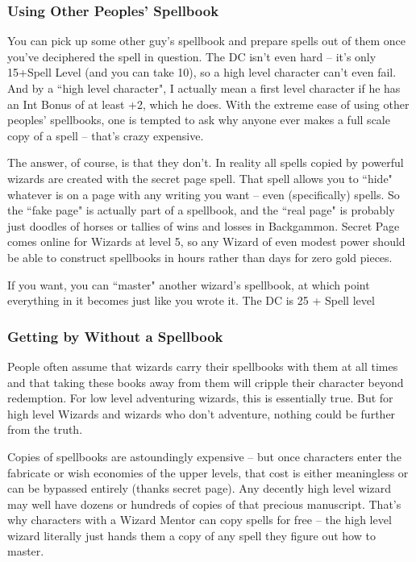 \subsubsection{Using Other Peoples' Spellbook}

You can pick up some other guy's spellbook and prepare spells out of them once you've deciphered the spell in question. The DC isn't even hard -- it's only 15+Spell Level (and you can take 10), so a high level character can't even fail. And by a ``high level character", I actually mean a first level character if he has an Int Bonus of at least +2, which he does. With the extreme ease of using other peoples' spellbooks, one is tempted to ask why anyone ever makes a full scale copy of a spell -- that's crazy expensive.

The answer, of course, is that they don't. In reality all spells copied by powerful wizards are created with the secret page spell. That spell allows you to ``hide" whatever is on a page with any writing you want -- even (specifically) spells. So the ``fake page" is actually part of a spellbook, and the ``real page" is probably just doodles of horses or tallies of wins and losses in Backgammon. Secret Page comes online for Wizards at level 5, so any Wizard of even modest power should be able to construct spellbooks in hours rather than days for zero gold pieces.

If you want, you can ``master" another wizard's spellbook, at which point everything in it becomes just like you wrote it. The DC is 25 + Spell level

\subsubsection{Getting by Without a Spellbook}

People often assume that wizards carry their spellbooks with them at all times and that taking these books away from them will cripple their character beyond redemption. For low level adventuring wizards, this is essentially true. But for high level Wizards and wizards who don't adventure, nothing could be further from the truth.

Copies of spellbooks are astoundingly expensive -- but once characters enter the fabricate or wish economies of the upper levels, that cost is either meaningless or can be bypassed entirely (thanks secret page). Any decently high level wizard may well have dozens or hundreds of copies of that precious manuscript. That's why characters with a Wizard Mentor can copy spells for free -- the high level wizard literally just hands them a copy of any spell they figure out how to master.

